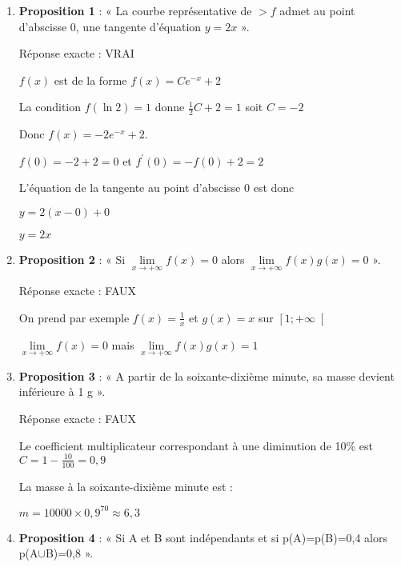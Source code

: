 \begin{corrige}
     \begin{enumerate}
          \item
          \textbf{Proposition 1} : « La courbe représentative de $ > f$ admet au point d'abscisse 0, une tangente d'équation $y=2x$ ».
          \par
          Réponse exacte : VRAI
          \par
          $f\left(x\right)$ est de la forme $f\left(x\right)=Ce^{-x}+2$
          \par
          La condition $f\left(\ln2\right)=1$ donne $\frac{1}{2}C+2=1$ soit $C=-2$
          \par
          Donc $f\left(x\right)=-2e^{-x}+2$.
          \par
          $f\left(0\right)=-2+2=0$ et $f^{\prime}\left(0\right)=-f\left(0\right)+2=2$
          \par
          L'équation de la tangente au point d'abscisse 0 est donc
          \par
          $y=2\left(x-0\right)+0$
          \par
          $y=2x$
          \item
          \textbf{Proposition 2} : « Si $\lim\limits_{x\rightarrow +\infty }f\left(x\right)=0$ alors $\lim\limits_{x\rightarrow +\infty }f\left(x\right)g\left(x\right)=0$ ».
          \par
          Réponse exacte : FAUX
          \par
          On prend par exemple $f\left(x\right)=\frac{1}{x}$ et $g\left(x\right)=x$ sur $\left[1;+\infty \right[$
          \par
          $\lim\limits_{x\rightarrow +\infty }f\left(x\right)=0$ mais $\lim\limits_{x\rightarrow +\infty }f\left(x\right)g\left(x\right)=1$
          \item
          \textbf{Proposition 3} : « A partir de la soixante-dixième minute, sa masse devient inférieure à 1 g ».
          \par
          Réponse exacte : FAUX
          \par
          Le coefficient multiplicateur correspondant à une diminution de 10\% est $C=1-\frac{10}{100}=0,9$
          \par
          La masse à la soixante-dixième minute est :
          \par
          $m=10 000\times 0,9^{70}\approx 6,3$
          \item
          \textbf{Proposition 4} : « Si A et B sont indépendants et si p(A)=p(B)=0,4 alors p(A$\cup $B)=0,8 ».

\end{enumerate}
\end{corrige}

